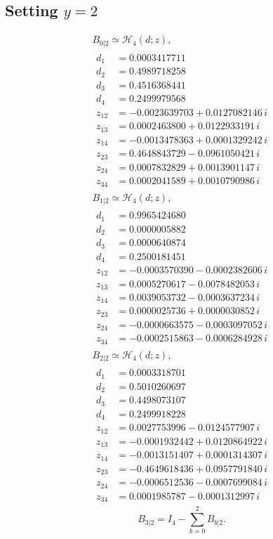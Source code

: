 \documentclass[11pt]{article}
\begin{document}
\subsection*{Setting $y=2$}
\[
\begin{gathered}
B_{0|2}\simeq\mathcal H_4(d;z),\\[3pt]
\begin{aligned}
d_1&=0.0003417711 \\
d_2&=0.4989718258 \\
d_3&=0.4516368441 \\
d_4&=0.2499979568 \\
z_{12}&=-0.0023639703+0.0127082146\,i \\
z_{13}&=0.0002463800+0.0122933191\,i \\
z_{14}&=-0.0013478363+0.0001329242\,i \\
z_{23}&=0.4648843729-0.0961050421\,i \\
z_{24}&=0.0007832829+0.0013901147\,i \\
z_{34}&=0.0002041589+0.0010790986\,i
\end{aligned}
\end{gathered}
\]
\[
\begin{gathered}
B_{1|2}\simeq\mathcal H_4(d;z),\\[3pt]
\begin{aligned}
d_1&=0.9965424680 \\
d_2&=0.0000005882 \\
d_3&=0.0000640874 \\
d_4&=0.2500181451 \\
z_{12}&=-0.0003570390-0.0002382606\,i \\
z_{13}&=0.0005270617-0.0078482053\,i \\
z_{14}&=0.0039053732-0.0003637234\,i \\
z_{23}&=0.0000025736+0.0000030852\,i \\
z_{24}&=-0.0000663575-0.0003097052\,i \\
z_{34}&=-0.0002515863-0.0006284928\,i
\end{aligned}
\end{gathered}
\]
\[
\begin{gathered}
B_{2|2}\simeq\mathcal H_4(d;z),\\[3pt]
\begin{aligned}
d_1&=0.0003318701 \\
d_2&=0.5010260697 \\
d_3&=0.4498073107 \\
d_4&=0.2499918228 \\
z_{12}&=0.0027753996-0.0124577907\,i \\
z_{13}&=-0.0001932442+0.0120864922\,i \\
z_{14}&=-0.0013151407+0.0001314307\,i \\
z_{23}&=-0.4649618436+0.0957791840\,i \\
z_{24}&=-0.0006512536-0.0007699084\,i \\
z_{34}&=0.0001985787-0.0001312997\,i
\end{aligned}
\end{gathered}
\]
\[
B_{3|2}=I_4-\sum_{b=0}^2B_{b|2}.
\]
\end{document}
